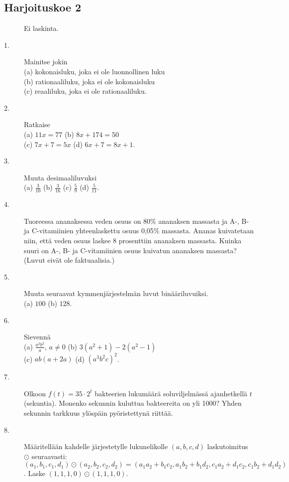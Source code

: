 \subsection*{Harjoituskoe 2}

\begin{description}
	\item[] Ei laskinta.
	\item[1.] Mainitse jokin \\
	(a) kokonaisluku, joka ei ole luonnollinen luku \\
	(b) rationaaliluku, joka ei ole kokonaisluku \\
	(c) reaaliluku, joka ei ole rationaaliluku.
	\item[2.] Ratkaise \\
	(a) $11x=77$ \qquad
	(b) $8x+174=50$ \\
	(c) $7x+7=5x$ \qquad
	(d) $6x+7=8x+1$.
	\item[3.] Muuta desimaaliluvuksi \\
	(a) $\frac{3}{10}$ \qquad
	(b) $\frac{3}{16}$ \qquad
	(c) $\frac{5}{9}$ \qquad
	(d) $\frac{5}{11}$.
	\item[4.] Tuoreessa ananaksessa veden osuus on 80\% ananaksen massasta ja A-, B- ja C-vitamiinien yhteenlaskettu osuus 0,05\% massasta. Ananas kuivatetaan niin, että veden osuus laskee 8 prosenttiin ananaksen massasta. Kuinka suuri on A-, B- ja C-vitamiinien osuus kuivatun ananaksen massasta? (Luvut eivät ole faktuaalisia.)
	\item[5.] Muuta seuraavat kymmenjärjestelmän luvut binääriluvuiksi. \\
	(a) $100$ \qquad
	(b) $128$.
	\item[6.] Sievennä \\
	(a) $\frac{a^2 b^2}{a}$, $a \neq 0$ \qquad
	(b) $3(a^2+1)-2(a^2-1)$ \\
	(c) $ab(a+2a)$ \qquad
	(d) $(a^3 b^2 c)^2$.
	\item[7.] Olkoon $f(t) = 35 \cdot 2^t$ bakteerien lukumäärä soluviljelmässä ajanhetkellä $t$ (sekuntia). Monenko sekunnin kuluttua bakteereita on yli 1000? Yhden sekunnin tarkkuus ylöspäin pyöristettynä riittää.
	\item[8.] Määritellään kahdelle järjestetylle lukunelikolle $(a, b, c, d)$ laskutoimitus $\odot$ seuraavasti: $(a_1, b_1, c_1, d_1) \odot (a_2, b_2, c_2, d_2) = (a_1 a_2 + b_1 c_2, a_1 b_2 + b_1 d_2, c_1 a_2 + d_1 c_2, c_1 b_2 + d_1 d_2)$. Laske $(1, 1, 1, 0) \odot (1, 1, 1, 0)$.

\end{description}
